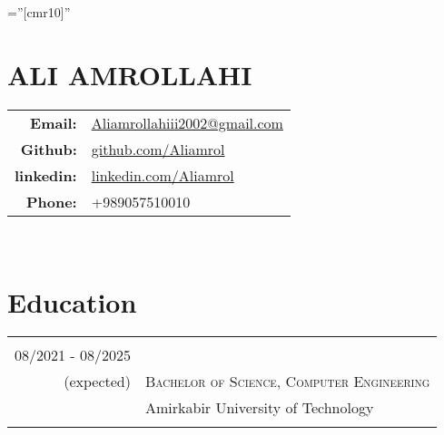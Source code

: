 \documentclass[a4paper,12pt]{article} %
\begin{document}
\pagestyle{empty} %
\font\fb=''[cmr10]'' %


\section{ALI AMROLLAHI}
\begin{tabular}{rl}
\vspace{0.2cm}
\textbf{Email:}   &  \href{mailto:aliamrollahiii2002@gmail.com}{Aliamrollahiii2002@gmail.com}\\
\vspace{0.2cm}
\textbf{Github:} 					& \href{https://github.com/Aliamrol}{github.com/Aliamrol} \\  
\vspace{0.2cm}
\textbf{linkedin:} 					& \href{https://www.linkedin.com/in/ali-amrollahi-12383022a/}
{linkedin.com/Aliamrol} \\  
\vspace{0.2cm}
\textbf{Phone:} 					& 
+989057510010 \\

\end{tabular}
\\
\vspace{0.5cm}
\section{Education}
\begin{tabular}{r|l}	

\multicolumn{2}{c}{} \\	%

08/2021 - 08/2025\\(expected) 							& \textsc{Bachelor of Science, Computer Engineering}\\
          							& Amirkabir University of Technology  \\
\\

\end{tabular}
\\
\end{document}
